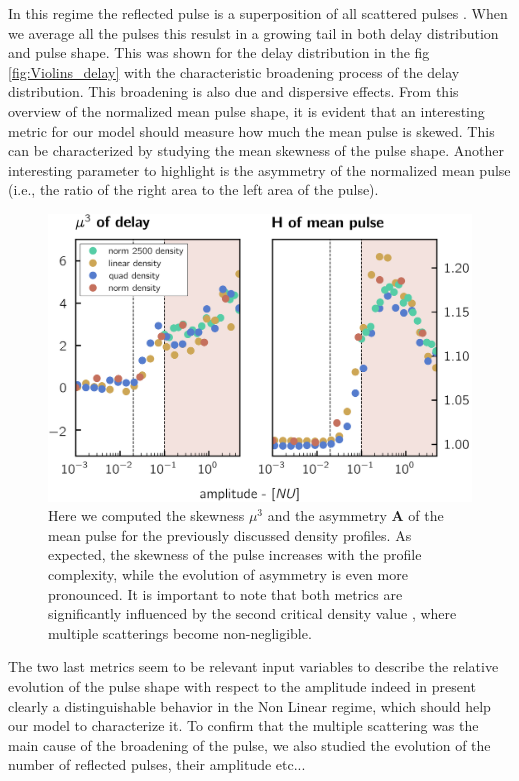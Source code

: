 \documentclass[11pt,openany]{report}
\begin{document}
\begin{multicols}{2}
    In this regime the reflected pulse is a superposition of all scattered pulses . When we average all the pulses this resulst in a growing tail in both delay distribution and pulse shape. This was shown for the delay distribution in the fig \ref{fig:Violins_delay} with the characteristic broadening process of the delay distribution. This broadening is also due and dispersive effects. From this overview of the normalized mean pulse shape, it is evident that an interesting metric for our model should measure how much the mean pulse is skewed. This can be characterized by studying the mean skewness of the pulse shape. Another interesting parameter to highlight is the asymmetry  of the normalized mean pulse (i.e., the ratio of the right area to the left area of the pulse).
    \begin{figure}[H]
        \centering
        \hspace*{-.5cm}\includegraphics[scale = 1]{./figures/skew_Hyst.png}
        \caption{Here we computed the skewness $\mu^3$ and the asymmetry  \textbf{A} of the mean pulse for the previously discussed density profiles. As expected, the skewness of the pulse increases with the profile complexity, while the evolution of asymmetry  is even more pronounced. It is important to note that both metrics are significantly influenced by the second critical density value \cite{Krutkin_thesis}, where multiple scatterings become non-negligible.}
        \label{fig:skew}
    \end{figure}
    \renewcommand{\topfraction}{0.7}
    \renewcommand{\bottomfraction}{0.1}
    The two last metrics seem to be relevant input variables to describe the relative evolution of the pulse shape with respect to the amplitude  indeed in present clearly a distinguishable behavior in the Non Linear regime, which should help our model to characterize it. To confirm that the multiple scattering was the main cause of the broadening of the pulse, we also studied the evolution of the number of reflected pulses, their amplitude etc...

\end{multicols}
\end{document}
